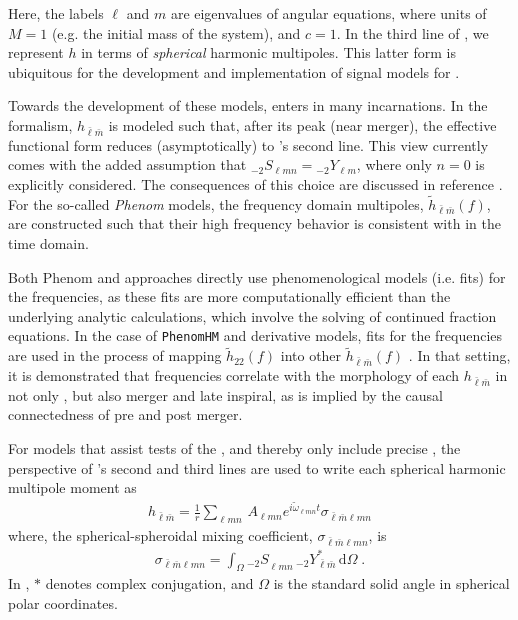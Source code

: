\documentclass[twocolumn,aps,prd,floatfix,preprintnumbers,a4paper,nofootinbib,
superscriptaddress,10pt]{revtex4-1}
\def\check#1{\red{#1}}
\newcommand{\cw}{\tilde{\omega}}
\def\lmn{_{\ell m n}}
\def\LM{_{\bar{\ell} \bar{m}}}
\def\LMlmn{_{\bar{\ell} \bar{m} \ell m n}}
\begin{document}
%
Here, the labels $\ell$ and $m$ are eigenvalues of  angular equations, where units of $M=1$ (e.g. the initial mass of the \bbh{} system), and $c=1$.
%
In the third line of , we represent $h$ in terms of \textit{spherical} harmonic multipoles.
%
This latter form is ubiquitous for the development and implementation of \imr{} signal models for .
%
%
\par Towards the development of these models,  enters in many incarnations.
%
In the \eob{} formalism, $h\LM$ is modeled such that, after its peak (near merger), the effective functional form reduces (asymptotically) to 's second line.
%
This view currently comes with the added assumption that ${_{-2}}S_{\ell m n} = {_{-2}}Y_{\ell m}$, where only $n=0$ is explicitly considered.
%
The consequences of this choice are discussed in reference \check{[X]}.
%
For the so-called \textit{Phenom} models, the frequency domain multipoles, $\tilde{h}\LM(f)$, are constructed such that their high frequency behavior is consistent with  in the time domain.
%
\par Both Phenom and \eob{} approaches directly use phenomenological models (i.e. fits) for the \qnm{} frequencies, as these fits are more computationally efficient than the underlying analytic calculations, which involve the solving of continued fraction equations.
%
In the case of \texttt{PhenomHM} and derivative models, fits for the \qnm{} frequencies are used in the process of mapping $\tilde{h}_{22}(f)$ into other $\tilde{h}\LM(f)$ \check{[X]}.
%
In that setting, it is demonstrated that \qnm{} frequencies correlate with the morphology of each $h\LM$ in not only \rd{}, but also merger and late inspiral, as is implied by the causal connectedness of pre and post merger.
%
%
\par For models that assist tests of the \nht{}, and thereby only include precise , the perspective of 's second and third lines are used to write each spherical harmonic multipole moment as
%
\begin{align}
	\label{hlm}
	h\LM = \frac{1}{r} \sum\lmn \, A\lmn e^{i \cw\lmn t} \sigma\LMlmn
\end{align}
%
where, the spherical-spheroidal mixing coefficient, $\sigma\LMlmn$, is
%
\begin{align}
		\label{sigma}
		\sigma\LMlmn = \int_{\Omega} {_{-2}S}\lmn \,  {_{-2}}Y^*\LM \, \mathrm{d} \Omega \; .
\end{align}
%
In , $*$ denotes complex conjugation, and $\Omega$ is the standard solid angle in spherical polar coordinates.
\end{document}
